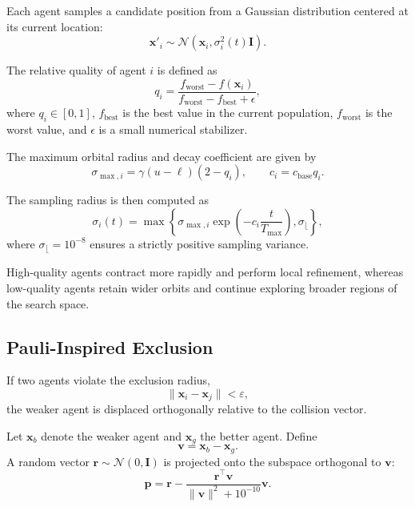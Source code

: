 \documentclass[final,5p,times,twocolumn]{elsarticle}
\begin{document}
Each agent samples a candidate position from a Gaussian
distribution centered at its current location:
\begin{equation}
\mathbf{x}'_i \sim
\mathcal{N}\left(\mathbf{x}_i,\sigma_i^2(t)\mathbf{I}\right).
\end{equation}

The relative quality of agent $i$ is defined as
\begin{equation}
q_i =
\frac{f_{\mathrm{worst}}-f(\mathbf{x}_i)}
{f_{\mathrm{worst}}-f_{\mathrm{best}}+\epsilon},
\end{equation}
where $q_i\in[0,1]$, $f_{\mathrm{best}}$ is the best value in
the current population, $f_{\mathrm{worst}}$ is the worst value,
and $\epsilon$ is a small numerical stabilizer.

The maximum orbital radius and decay coefficient are given by
\begin{equation}
\sigma_{\max,i}=\gamma(u-\ell)(2-q_i),
\qquad
c_i=c_{\mathrm{base}}q_i.
\end{equation}

The sampling radius is then computed as
\begin{equation}
\sigma_i(t)=
\max\left\{
\sigma_{\max,i}
\exp\left(-c_i\frac{t}{T_{\max}}\right),
\sigma_{\lfloor}
\right\},
\end{equation}
where $\sigma_{\lfloor}=10^{-8}$ ensures a strictly positive
sampling variance.

High-quality agents contract more rapidly and perform local
refinement, whereas low-quality agents retain wider orbits and
continue exploring broader regions of the search space.

\subsection{Pauli-Inspired Exclusion}

If two agents violate the exclusion radius,
\begin{equation}
\|\mathbf{x}_i-\mathbf{x}_j\|<\varepsilon,
\end{equation}
the weaker agent is displaced orthogonally relative to the
collision vector.

Let $\mathbf{x}_b$ denote the weaker agent and $\mathbf{x}_g$
the better agent. Define
\begin{equation}
\mathbf{v}=\mathbf{x}_b-\mathbf{x}_g.
\end{equation}
A random vector $\mathbf{r}\sim\mathcal{N}(0,\mathbf{I})$ is
projected onto the subspace orthogonal to $\mathbf{v}$:
\begin{equation}
\mathbf{p}
=
\mathbf{r}
-
\frac{\mathbf{r}^{\top}\mathbf{v}}
{\|\mathbf{v}\|^2+10^{-10}}
\mathbf{v}.
\end{equation}
\end{document}
